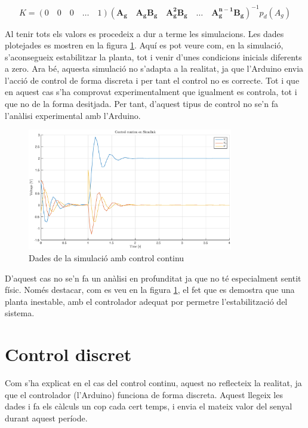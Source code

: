 \documentclass[12pt,a4paper,final,twoside,openright]{report}
\begin{document}
\begin{equation}\label{eq:Acker}
K=(0\quad0\quad0\quad\dots\quad1)(\mathbf{A_g}\quad \mathbf{A_g B_g}\quad \mathbf{A_g^2 B_g}\quad \dots\quad \mathbf{A_g^{n-1} B_g})^{-1} p_d(A_g)
\end{equation}

Al tenir tots els valors es procedeix a dur a terme les simulacions. Les dades plotejades es mostren en la figura \ref{fig:cont_sim}. Aquí es pot veure com, en la simulació, s'aconsegueix estabilitzar la planta, tot i venir d'unes condicions inicials diferents a zero. Ara bé, aquesta simulació no s'adapta a la realitat, ja que l'Arduino envia l'acció de control de forma discreta i per tant el control no es correcte. Tot i que en aquest cas s'ha comprovat experimentalment que igualment es controla, tot i que no de la forma desitjada. Per tant, d'aquest tipus de control no se'n fa l'anàlisi experimental amb l'Arduino. 

\begin{figure}
\centering
\includegraphics[width=0.8\textwidth]{Imatges/cont_sim.eps}
\caption{Dades de la simulació amb control continu\label{fig:cont_sim}}
\end{figure}

D'aquest cas no se'n fa un anàlisi en profunditat ja que no té especialment sentit físic. Només destacar, com es veu en la figura \ref{fig:cont_sim}, el fet que es demostra que una planta inestable, amb el controlador adequat por permetre l'estabilització del sistema.

\section{Control discret}

Com s'ha explicat en el cas del control continu, aquest no reflecteix la realitat, ja que el controlador (l'Arduino) funciona de forma discreta. Aquest llegeix les dades i fa els càlculs un cop cada cert temps, i envia el mateix valor del senyal durant aquest període.
\end{document}
